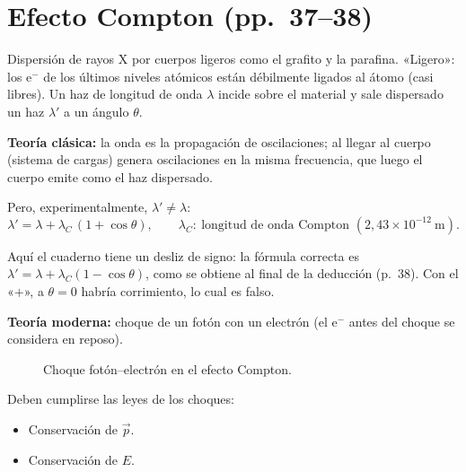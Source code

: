 \documentclass[11pt,a4paper]{article}
\newcommand{\pags}[1]{{\normalfont\small\color{gris}(pp.~#1)}}
\begin{document}
\section{Efecto Compton \pags{37--38}}

Dispersión de rayos X por cuerpos ligeros como el grafito y la parafina. «Ligero»: los e$^-$ de los últimos
niveles atómicos están débilmente ligados al átomo (casi libres). Un haz de longitud de onda $\lambda$ incide
sobre el material y sale dispersado un haz $\lambda'$ a un ángulo $\theta$.

\textbf{Teoría clásica:} la onda es la propagación de oscilaciones; al llegar al cuerpo (sistema de cargas)
genera oscilaciones en la misma frecuencia, que luego el cuerpo emite como el haz dispersado.

Pero, experimentalmente, $\lambda'\neq\lambda$:
\[
\lambda'=\lambda+\lambda_C\,(1+\cos\theta),\qquad \lambda_C:\ \text{longitud de onda Compton }(2{,}43\times10^{-12}\ \text{m}).
\]

\begin{obs}
Aquí el cuaderno tiene un desliz de signo: la fórmula correcta es $\lambda'=\lambda+\lambda_C(1-\cos\theta)$, como se
obtiene al final de la deducción (p.~38). Con el «$+$», a $\theta=0$ habría corrimiento, lo cual es falso.
\end{obs}

\textbf{Teoría moderna:} choque de un fotón con un electrón (el e$^-$ antes del choque se considera en reposo).

\begin{figure}[H]
\centering
{}
\caption{Choque fotón--electrón en el efecto Compton.}
\end{figure}

Deben cumplirse las leyes de los choques:
\begin{itemize}
  \item Conservación de $\vec p$.
  \item Conservación de $E$.
\end{itemize}
\end{document}
